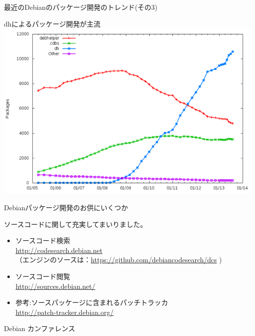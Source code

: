 \begin{frame}{最近のDebianのパッケージ開発のトレンド(その3)}
\begin{center}
\Large{dhによるパッケージ開発が主流}\\
\includegraphics[width=0.8\hsize]{image201310/debian-dev-dh.png}
\end{center}
\end{frame}

\begin{frame}{Debianパッケージ開発のお供にいくつか}

ソースコードに関して充実してまいりました。
\begin{itemize}
\item ソースコード検索\\
\url{http://codesearch.debian.net}\\
（エンジンのソースは：\url{https://github.com/debiancodesearch/dcs} )\\
\item ソースコード閲覧\\
\url{http://sources.debian.net/}
\item 参考:ソースパッケージに含まれるパッチトラッカ\\
\url{http://patch-tracker.debian.org/}
\end{itemize}
\end{frame}

\begin{frame}
\begin{center}
\LARGE{Debian カンファレンス}
\end{center}
\end{frame}


